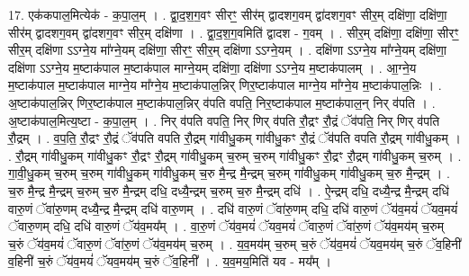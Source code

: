 \documentclass[17pt]{extarticle}
\begin{document}
17. एक॑कपाल॒मित्येक॑ - क॒पा॒ल॒म् । . द्वा॒द॒श॒ग॒वꣳ सीरꣳ॒॒ सीर॑म् द्वादशग॒वम् द्वा॑दशग॒वꣳ सीर॒म् दक्षि॑णा॒ दक्षि॑णा॒ सीर॑म् द्वादशग॒वम् द्वा॑दशग॒वꣳ सीर॒म् दक्षि॑णा । . द्वा॒द॒श॒ग॒वमिति॑ द्वादश - ग॒वम् । . सीर॒म् दक्षि॑णा॒ दक्षि॑णा॒ सीरꣳ॒॒ सीर॒म् दक्षि॑णा ऽऽग्ने॒य मा᳚ग्ने॒यम् दक्षि॑णा॒ सीरꣳ॒॒ सीर॒म् दक्षि॑णा ऽऽग्ने॒यम् । . दक्षि॑णा ऽऽग्ने॒य मा᳚ग्ने॒यम् दक्षि॑णा॒ दक्षि॑णा ऽऽग्ने॒य म॒ष्टाक॑पाल म॒ष्टाक॑पाल माग्ने॒यम् दक्षि॑णा॒ दक्षि॑णा ऽऽग्ने॒य म॒ष्टाक॑पालम् । . आ॒ग्ने॒य म॒ष्टाक॑पाल म॒ष्टाक॑पाल माग्ने॒य मा᳚ग्ने॒य म॒ष्टाक॑पाल॒न्निर् णिर॒ष्टाक॑पाल माग्ने॒य मा᳚ग्ने॒य म॒ष्टाक॑पाल॒न्निः । . अ॒ष्टाक॑पाल॒न्निर् णिर॒ष्टाक॑पाल म॒ष्टाक॑पाल॒न्निर् व॑पति वपति॒ निर॒ष्टाक॑पाल म॒ष्टाक॑पाल॒न् निर् व॑पति । . अ॒ष्टाक॑पाल॒मित्य॒ष्टा - क॒पा॒ल॒म् । . निर् व॑पति वपति॒ निर् णिर् व॑पति रौ॒द्रꣳ रौ॒द्रं ॅव॑पति॒ निर् णिर् व॑पति रौ॒द्रम् । . व॒प॒ति॒ रौ॒द्रꣳ रौ॒द्रं ॅव॑पति वपति रौ॒द्रम् गा॑वीधु॒कम् गा॑वीधु॒कꣳ रौ॒द्रं ॅव॑पति वपति रौ॒द्रम् गा॑वीधु॒कम् । . रौ॒द्रम् गा॑वीधु॒कम् गा॑वीधु॒कꣳ रौ॒द्रꣳ रौ॒द्रम् गा॑वीधु॒कम् च॒रुम् च॒रुम् गा॑वीधु॒कꣳ रौ॒द्रꣳ रौ॒द्रम् गा॑वीधु॒कम् च॒रुम् । . गा॒वी॒धु॒कम् च॒रुम् च॒रुम् गा॑वीधु॒कम् गा॑वीधु॒कम् च॒रु मै॒न्द्र मै॒न्द्रम् च॒रुम् गा॑वीधु॒कम् गा॑वीधु॒कम् च॒रु मै॒न्द्रम् । . च॒रु मै॒न्द्र मै॒न्द्रम् च॒रुम् च॒रु मै॒न्द्रम् दधि॒ दध्यै॒न्द्रम् च॒रुम् च॒रु मै॒न्द्रम् दधि॑ । . ऐ॒न्द्रम् दधि॒ दध्यै॒न्द्र मै॒न्द्रम् दधि॑ वारु॒णं ॅवा॑रु॒णम् दध्यै॒न्द्र मै॒न्द्रम् दधि॑ वारु॒णम् । . दधि॑ वारु॒णं ॅवा॑रु॒णम् दधि॒ दधि॑ वारु॒णं ॅय॑व॒मयं॑ ॅयव॒मयं॑ ॅवारु॒णम् दधि॒ दधि॑ वारु॒णं ॅय॑व॒मय᳚म् । . वा॒रु॒णं ॅय॑व॒मयं॑ ॅयव॒मयं॑ ॅवारु॒णं ॅवा॑रु॒णं ॅय॑व॒मय॑म् च॒रुम् च॒रुं ॅय॑व॒मयं॑ ॅवारु॒णं ॅवा॑रु॒णं ॅय॑व॒मय॑म् च॒रुम् । . य॒व॒मय॑म् च॒रुम् च॒रुं ॅय॑व॒मयं॑ ॅयव॒मय॑म् च॒रुं ॅव॒हिनी॑ व॒हिनी॑ च॒रुं ॅय॑व॒मयं॑ ॅयव॒मय॑म् च॒रुं ॅव॒हिनी᳚ । . य॒व॒मय॒मिति॑ यव - मय᳚म् । \newline
\end{document}
